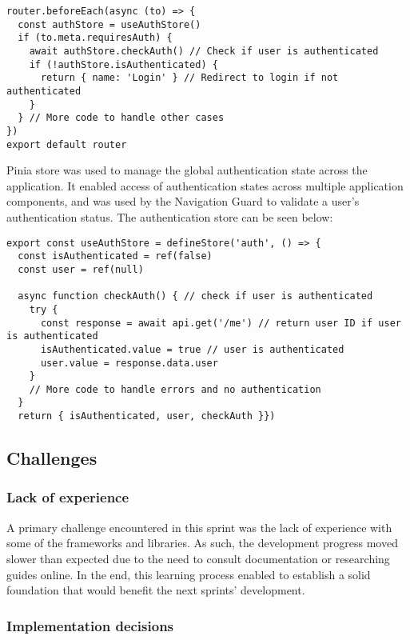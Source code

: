 \begin{lstlisting}[caption=Navigation Guard]
router.beforeEach(async (to) => {
  const authStore = useAuthStore()
  if (to.meta.requiresAuth) {
    await authStore.checkAuth() // Check if user is authenticated
    if (!authStore.isAuthenticated) {
      return { name: 'Login' } // Redirect to login if not authenticated
    }
  } // More code to handle other cases
})
export default router
\end{lstlisting}

Pinia store was used to manage the global authentication state across the application. It enabled access of authentication states across multiple application components, and was used by the Navigation Guard to validate a user's authentication status. The authentication store can be seen below:

\begin{lstlisting}[caption=Pinia Store for Authentication]
export const useAuthStore = defineStore('auth', () => {
  const isAuthenticated = ref(false)
  const user = ref(null)

  async function checkAuth() { // check if user is authenticated
    try {
      const response = await api.get('/me') // return user ID if user is authenticated
      isAuthenticated.value = true // user is authenticated
      user.value = response.data.user
    }
    // More code to handle errors and no authentication
  }
  return { isAuthenticated, user, checkAuth }})
\end{lstlisting}

\subsection{Challenges}

\subsubsection{Lack of experience}

A primary challenge encountered in this sprint was the lack of experience with some of the frameworks and libraries. As such, the development progress moved slower than expected due to the need to consult documentation or researching guides online. In the end, this learning process enabled to establish a solid foundation that would benefit the next sprints' development.

\subsubsection{Implementation decisions}

